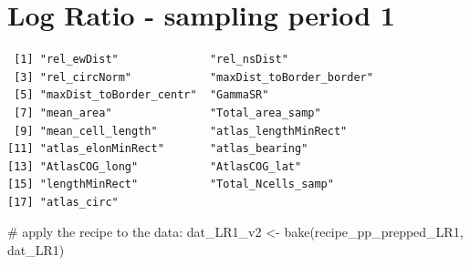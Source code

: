 \documentclass[
  letterpaper,
  DIV=11,
  numbers=noendperiod]{scrreprt}
\newenvironment{Shaded}{\begin{snugshade}}{\end{snugshade}}
\newcommand{\AttributeTok}[1]{\textcolor[rgb]{0.40,0.45,0.13}{#1}}
\newcommand{\CommentTok}[1]{\textcolor[rgb]{0.37,0.37,0.37}{#1}}
\newcommand{\DecValTok}[1]{\textcolor[rgb]{0.68,0.00,0.00}{#1}}
\newcommand{\FunctionTok}[1]{\textcolor[rgb]{0.28,0.35,0.67}{#1}}
\newcommand{\NormalTok}[1]{\textcolor[rgb]{0.00,0.23,0.31}{#1}}
\newcommand{\OtherTok}[1]{\textcolor[rgb]{0.00,0.23,0.31}{#1}}
\newcommand{\SpecialCharTok}[1]{\textcolor[rgb]{0.37,0.37,0.37}{#1}}
\begin{document}
\section{Log Ratio - sampling period 1}

\begin{Shaded}
\end{Shaded}

\begin{verbatim}
 [1] "rel_ewDist"              "rel_nsDist"             
 [3] "rel_circNorm"            "maxDist_toBorder_border"
 [5] "maxDist_toBorder_centr"  "GammaSR"                
 [7] "mean_area"               "Total_area_samp"        
 [9] "mean_cell_length"        "atlas_lengthMinRect"    
[11] "atlas_elonMinRect"       "atlas_bearing"          
[13] "AtlasCOG_long"           "AtlasCOG_lat"           
[15] "lengthMinRect"           "Total_Ncells_samp"      
[17] "atlas_circ"             
\end{verbatim}

\begin{Shaded}
\begin{Highlighting}[]
\CommentTok{\# apply the recipe to the data:}
\NormalTok{dat\_LR1\_v2 }\OtherTok{\textless{}{-}} \FunctionTok{bake}\NormalTok{(recipe\_pp\_prepped\_LR1, dat\_LR1)}
\end{Highlighting}
\end{Shaded}
\end{document}
